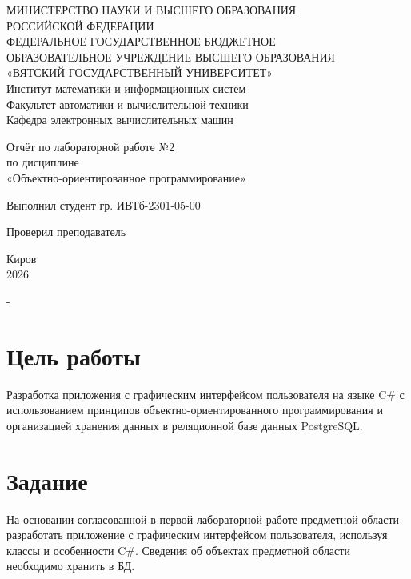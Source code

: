 \documentclass[oneside,a4paper,14pt]{extarticle}
\begin{document}
\newpage\thispagestyle{empty}
\begin{center}
    МИНИСТЕРСТВО НАУКИ И ВЫСШЕГО ОБРАЗОВАНИЯ\\
    РОССИЙСКОЙ ФЕДЕРАЦИИ\\
    ФЕДЕРАЛЬНОЕ ГОСУДАРСТВЕННОЕ БЮДЖЕТНОЕ\\
    ОБРАЗОВАТЕЛЬНОЕ УЧРЕЖДЕНИЕ ВЫСШЕГО ОБРАЗОВАНИЯ\\
    «ВЯТСКИЙ ГОСУДАРСТВЕННЫЙ УНИВЕРСИТЕТ»\\
    Институт математики и информационных систем\\
    Факультет автоматики и вычислительной техники\\
    Кафедра электронных вычислительных машин
\end{center}

\vspace{20mm}
\begin{center}

    Отчёт по лабораторной работе №2\\
    по дисциплине\\
    «Объектно-ориентированное программирование»\\
\end{center}
\vfill

Выполнил студент гр. ИВТб-2301-05-00 \hfill
{}

Проверил преподаватель\hfill
{}

\vfill
\begin{center}
    Киров\\
    2026
\end{center}
-
\newpage
\setcounter{page}{1}
\tableofcontents
\newpage

\section*{Цель работы}
Разработка приложения с графическим интерфейсом пользователя на языке C\# с использованием принципов объектно-ориентированного программирования и организацией хранения данных в реляционной базе данных PostgreSQL.

\section*{Задание}

На основании согласованной в первой лабораторной работе предметной области разработать приложение с графическим интерфейсом пользователя, используя классы и особенности C\#. Сведения об объектах предметной области необходимо хранить в БД.
\end{document}
